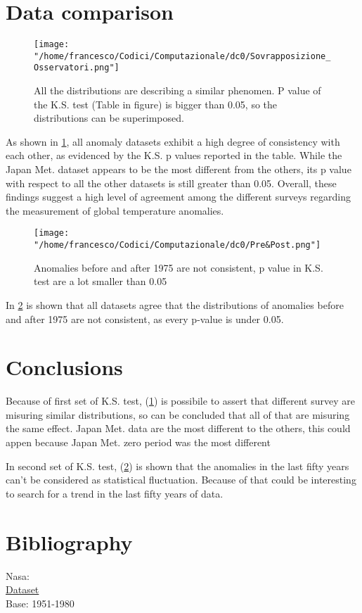 \documentclass[a4paper,11pt,rmp,superscriptaddress]{revtex4}
\begin{document}
\section*{Data comparison}
\begin{figure}[h!]
    \centering
    \texttt{[image: "/home/francesco/Codici/Computazionale/dc0/Sovrapposizione\_Osservatori.png"]}
    \caption[short]{All the distributions are describing a similar phenomen. P value of the K.S. test (Table in figure) is bigger than 0.05, 
    so the distributions can be superimposed.}
    \label{fig:1}
\end{figure}
As shown in \ref*{fig:1}, all anomaly datasets exhibit a high degree of consistency with each other, 
as evidenced by the K.S. p values reported in the table. 
While the Japan Met. dataset appears to be the most different from the others, 
its p value with respect to all the other datasets is still greater than 0.05. 
Overall, these findings suggest a high level of agreement among the different surveys 
regarding the measurement of global temperature anomalies.

\begin{figure}[h!]
    \centering
    \texttt{[image: "/home/francesco/Codici/Computazionale/dc0/Pre\&Post.png"]}
    \caption[short]{Anomalies before and after 1975 are not consistent, p value in K.S. test are a lot smaller than 0.05}
    \label{fig:2}
\end{figure}
In \ref*{fig:2} is shown that all datasets agree that the distributions of anomalies before and after 1975 are not consistent, 
as every p-value is under 0.05.


\section*{Conclusions}
Because of first set of K.S. test, (\ref*{fig:1}) is possibile to assert that different survey are misuring similar distributions,
so can be concluded that all of that are misuring the same effect. Japan Met. data are the most different to the others, this could 
appen because Japan Met. zero period was the most different 

In second set of K.S. test, (\ref*{fig:2}) is shown that the anomalies in the last fifty years can't be considered as statistical fluctuation.
Because of that could be interesting to search for a trend in the last fifty years of data.


\section*{Bibliography}
Nasa:\\
\href{https://data.giss.nasa.gov/gistemp/graphs_v4/graph_data/Global_Mean_Estimates_based_on_Land_and_Ocean_Data/graph.txt}{Dataset}\\
Base: 1951-1980\\
\end{document}
